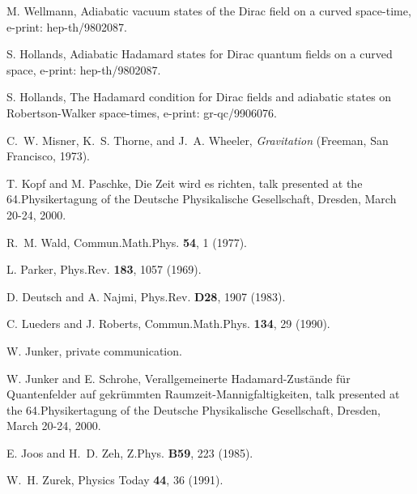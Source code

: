 \documentclass[a4paper,10pt,oneside]{amsart}
\theoremstyle{plain}
\theoremstyle{definition}
\theoremstyle{remark}
\begin{document}
\begin{thebibliography}{10}
M. Wellmann, Adiabatic vacuum states of the Dirac field on a
curved space-time,
  e-print: hep-th/9802087.

S. Hollands, Adiabatic Hadamard states for Dirac quantum fields on
a curved
  space, e-print: hep-th/9802087.

S. Hollands, The Hadamard condition for Dirac fields and adiabatic
states on
  Robertson-Walker space-times, e-print: gr-qc/9906076.

C.~W. Misner, K.~S. Thorne, and J.~A. Wheeler, {\em Gravitation}
(Freeman, San
  Francisco, 1973).

T. Kopf and M. Paschke, Die Zeit wird es richten, talk presented
at the
  64.Physikertagung of the Deutsche Physikalische Gesellschaft, Dresden, March
  20-24, 2000.

R.~M. Wald, Commun.Math.Phys. {\bf 54},  1  (1977).

L. Parker, Phys.Rev. {\bf 183},  1057  (1969).

D. Deutsch and A. Najmi, Phys.Rev. {\bf D28},  1907  (1983).

C. Lueders and J. Roberts, Commun.Math.Phys. {\bf 134},  29
(1990).

W. Junker, private communication.

W. Junker and E. Schrohe, Verallgemeinerte Hadamard-Zust\"{a}nde
f\"{u}r
  Quantenfelder auf gekr\"{u}mmten Raumzeit-Mannigfaltigkeiten, talk presented
  at the 64.Physikertagung of the Deutsche Physikalische Gesellschaft, Dresden,
  March 20-24, 2000.

E. Joos and H.~D. Zeh, Z.Phys. {\bf B59},  223  (1985).

W.~H. Zurek, Physics Today {\bf 44},  36  (1991).

\end{thebibliography}
\end{document}
